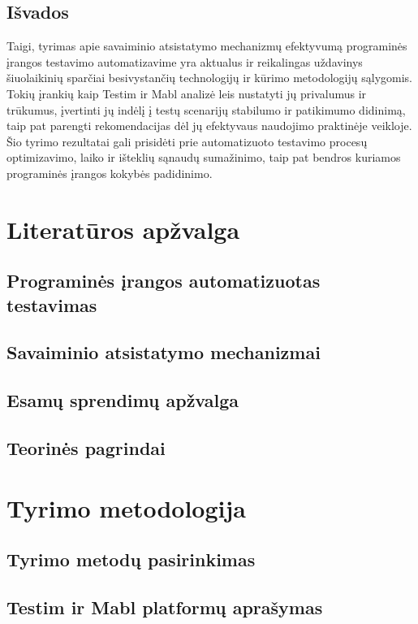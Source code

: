 \documentclass[
]{VUMIFPSkursinis}
\begin{document}
\subsection{Išvados}

Taigi, tyrimas apie savaiminio atsistatymo mechanizmų efektyvumą programinės įrangos testavimo automatizavime yra aktualus ir reikalingas uždavinys šiuolaikinių sparčiai besivystančių technologijų ir kūrimo metodologijų sąlygomis. Tokių įrankių kaip Testim ir Mabl analizė leis nustatyti jų privalumus ir trūkumus, įvertinti jų indėlį į testų scenarijų stabilumo ir patikimumo didinimą, taip pat parengti rekomendacijas dėl jų efektyvaus naudojimo praktinėje veikloje. Šio tyrimo rezultatai gali prisidėti prie automatizuoto testavimo procesų optimizavimo, laiko ir išteklių sąnaudų sumažinimo, taip pat bendros kuriamos programinės įrangos kokybės padidinimo.

\section{Literatūros apžvalga}

\subsection{Programinės įrangos automatizuotas testavimas}
\subsection{Savaiminio atsistatymo mechanizmai}
\subsection{Esamų sprendimų apžvalga}
\subsection{Teorinės pagrindai}

\section{Tyrimo metodologija}

\subsection{Tyrimo metodų pasirinkimas}
\subsection{Testim ir Mabl platformų aprašymas}
\end{document}
